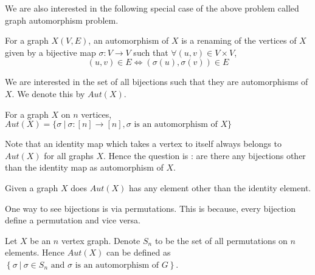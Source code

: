 We are also interested in the following special case of the above problem
called graph automorphism problem. 

\begin{definition}
	For a graph $X(V,E)$, an automorphism of $X$ is a renaming of the
	vertices of $X$ given by a bijective map $\sigma:V \to V$ such 
	that $\forall
	(u,v) \in V \times V$, \[(u,v) \in E \iff (\sigma(u), \sigma(v))
	\in E \]
\end{definition}
We are interested in the set of all bijections such that they are
automorphisms of $X$. We denote this by $Aut(X)$.
\begin{definition}
	For a graph $X$ on $n$ vertices, 
	$Aut(X) = \{ \sigma ~|~ \sigma :[n] \to [n], \sigma \text{ is an
	automorphism of }X \}$
\end{definition}

Note that an identity map which takes a vertex to itself always belongs to
$Aut(X)$ for all graphs $X$. Hence the question is : are there any bijections
other than the identity map as automorphism of $X$.

\begin{problem}
	Given a graph $X$ does $Aut(X)$ has any element other than the
	identity element.
\end{problem}

One way to see bijections is via permutations. This is because, every
bijection define a permutation and vice versa.

Let $X$ be an $n$ vertex graph. 
Denote $S_n$ to be the set of all permutations on $n$ elements. Hence $Aut(X)$
can be defined as $\left\{ \sigma ~|~ \sigma \in S_n \text{ and $\sigma$ is an
automorphism of } G\right\}$. 

